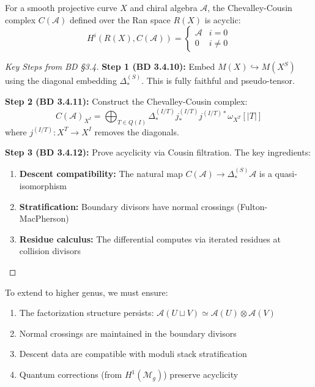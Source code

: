\begin{theorem}\label{thm:BD-genus-zero}
For a smooth projective curve $X$ and chiral algebra $\mathcal{A}$, the Chevalley-Cousin complex $C(\mathcal{A})$ defined over the Ran space $R(X)$ is acyclic:
$$H^i(R(X), C(\mathcal{A})) = 
\begin{cases}
\mathcal{A} & i = 0 \\
0 & i \neq 0
\end{cases}$$
\end{theorem}

\begin{proof}[Key Steps from BD §3.4]
\textbf{Step 1 (BD 3.4.10):} Embed $M(X) \hookrightarrow M(X^S)$ using the diagonal embedding $\Delta^{(S)}_*$. This is fully faithful and pseudo-tensor.

\textbf{Step 2 (BD 3.4.11):} Construct the Chevalley-Cousin complex:
$$C(\mathcal{A})_{X^I} = \bigoplus_{T \in Q(I)} \Delta^{(I/T)}_* j^{(I/T)}_* j^{(I/T)*} \omega_{X^T}[|T|]$$
where $j^{(I/T)}: X^T \to X^I$ removes the diagonals.

\textbf{Step 3 (BD 3.4.12):} Prove acyclicity via Cousin filtration. The key ingredients:
\begin{enumerate}
\item \textbf{Descent compatibility:} The natural map $C(\mathcal{A}) \to \Delta^{(S)}_* \mathcal{A}$ is a quasi-isomorphism
\item \textbf{Stratification:} Boundary divisors have normal crossings (Fulton-MacPherson)
\item \textbf{Residue calculus:} The differential computes via iterated residues at collision divisors
\end{enumerate}
\end{proof}

\begin{remark}\label{rem:what-to-preserve}
To extend to higher genus, we must ensure:
\begin{enumerate}
\item The factorization structure persists: $\mathcal{A}(U \sqcup V) \simeq \mathcal{A}(U) \otimes \mathcal{A}(V)$
\item Normal crossings are maintained in the boundary divisors
\item Descent data are compatible with moduli stack stratification
\item Quantum corrections (from $H^1(\mathcal{M}_g)$) preserve acyclicity
\end{enumerate}
\end{remark}

